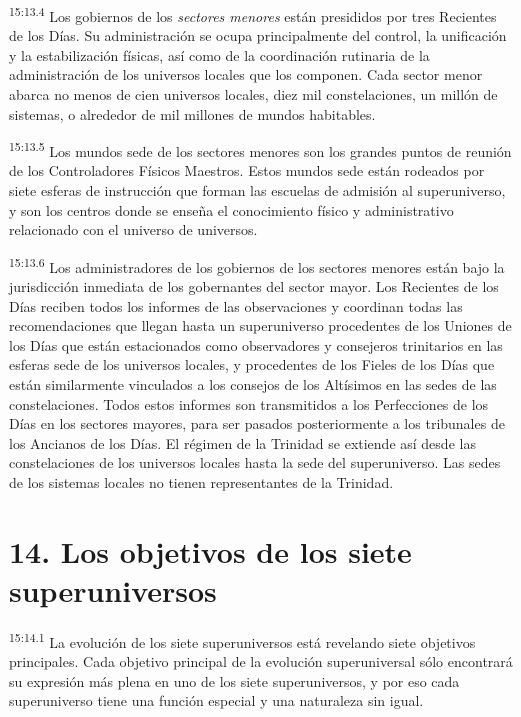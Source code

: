 \par
\textsuperscript{15:13.4} Los gobiernos de los \textit{sectores menores} están presididos por tres Recientes de los Días. Su administración se ocupa principalmente del control, la unificación y la estabilización físicas, así como de la coordinación rutinaria de la administración de los universos locales que los componen. Cada sector menor abarca no menos de cien universos locales, diez mil constelaciones, un millón de sistemas, o alrededor de mil millones de mundos habitables.

\par
\textsuperscript{15:13.5} Los mundos sede de los sectores menores son los grandes puntos de reunión de los Controladores Físicos Maestros. Estos mundos sede están rodeados por siete esferas de instrucción que forman las escuelas de admisión al superuniverso, y son los centros donde se enseña el conocimiento físico y administrativo relacionado con el universo de universos.

\par
\textsuperscript{15:13.6} Los administradores de los gobiernos de los sectores menores están bajo la jurisdicción inmediata de los gobernantes del sector mayor. Los Recientes de los Días reciben todos los informes de las observaciones y coordinan todas las recomendaciones que llegan hasta un superuniverso procedentes de los Uniones de los Días que están estacionados como observadores y consejeros trinitarios en las esferas sede de los universos locales, y procedentes de los Fieles de los Días que están similarmente vinculados a los consejos de los Altísimos en las sedes de las constelaciones. Todos estos informes son transmitidos a los Perfecciones de los Días en los sectores mayores, para ser pasados posteriormente a los tribunales de los Ancianos de los Días. El régimen de la Trinidad se extiende así desde las constelaciones de los universos locales hasta la sede del superuniverso. Las sedes de los sistemas locales no tienen representantes de la Trinidad.

\section*{14. Los objetivos de los siete superuniversos}
\par
\textsuperscript{15:14.1} La evolución de los siete superuniversos está revelando siete objetivos principales. Cada objetivo principal de la evolución superuniversal sólo encontrará su expresión más plena en uno de los siete superuniversos, y por eso cada superuniverso tiene una función especial y una naturaleza sin igual.

